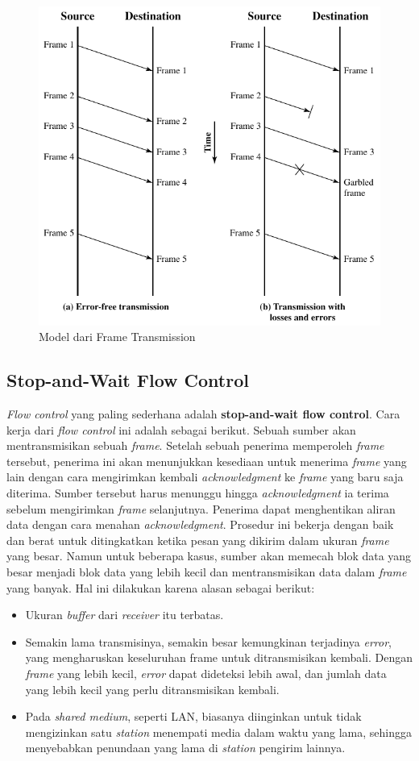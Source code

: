 \begin{figure}
	\centering
	\includegraphics[width=0.8\linewidth]{gambar/fig:07.01}
	\caption{Model dari Frame Transmission}
	\label{fig:07.01}
\end{figure}

\subsection{Stop-and-Wait Flow Control}

\textit{Flow control} yang paling sederhana adalah \textbf{stop-and-wait flow control}. Cara kerja dari \textit{flow control} ini adalah sebagai berikut. Sebuah sumber akan mentransmisikan sebuah \textit{frame}. Setelah sebuah penerima memperoleh \textit{frame} tersebut, penerima ini akan menunjukkan kesediaan untuk menerima \textit{frame} yang lain dengan cara mengirimkan kembali \textit{acknowledgment} ke \textit{frame} yang baru saja diterima. Sumber tersebut harus menunggu hingga \textit{acknowledgment} ia terima sebelum mengirimkan \textit{frame} selanjutnya. Penerima dapat menghentikan aliran data dengan cara menahan \textit{acknowledgment}. Prosedur ini bekerja dengan baik dan berat untuk ditingkatkan ketika pesan yang dikirim dalam ukuran \textit{frame} yang besar. Namun untuk beberapa kasus, sumber akan memecah blok data yang besar menjadi blok data yang lebih kecil dan mentransmisikan data dalam \textit{frame} yang banyak. Hal ini dilakukan karena alasan sebagai berikut:

\begin{itemize}
	\item Ukuran \textit{buffer} dari \textit{receiver} itu terbatas.
	\item Semakin lama transmisinya, semakin besar kemungkinan terjadinya \textit{error}, yang mengharuskan keseluruhan frame untuk ditransmisikan kembali. Dengan \textit{frame} yang lebih kecil, \textit{error} dapat dideteksi lebih awal, dan jumlah data yang lebih kecil yang perlu ditransmisikan kembali.
	\item Pada \textit{shared medium}, seperti LAN, biasanya diinginkan untuk tidak mengizinkan satu \textit{station} menempati media dalam waktu yang lama, sehingga menyebabkan penundaan yang lama di \textit{station} pengirim lainnya.
\end{itemize}

